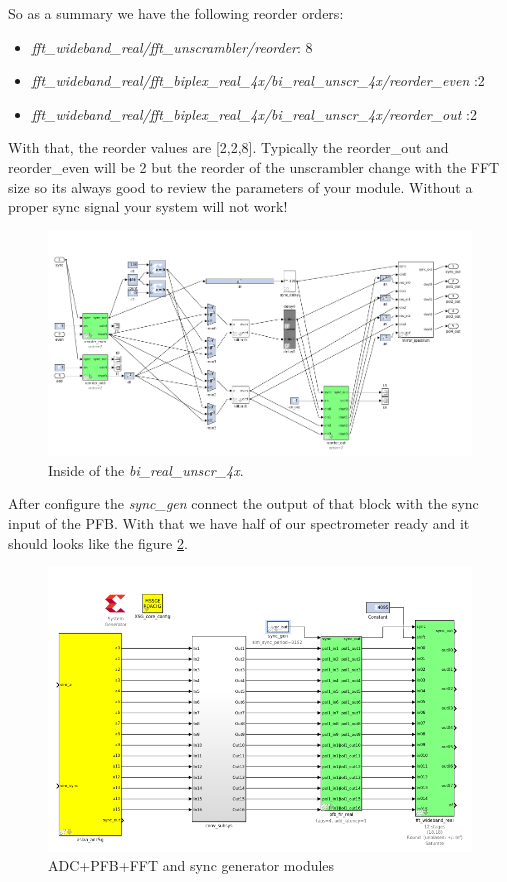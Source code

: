 So as a summary we have the following reorder orders:
\begin{itemize}
    \item \textit{fft\_wideband\_real/fft\_unscrambler/reorder}: 8
    \item \textit{fft\_wideband\_real/fft\_biplex\_real\_4x/bi\_real\_unscr\_4x/reorder\_even} :2 
    \item \textit{fft\_wideband\_real/fft\_biplex\_real\_4x/bi\_real\_unscr\_4x/reorder\_out} :2 
\end{itemize}

With that, the reorder values are [2,2,8]. Typically the reorder\_out and reorder\_even will be 2 but the reorder of the unscrambler change with the FFT size so its always good to review the parameters of your module.
Without a proper sync signal your system will not work!


\begin{figure}
    \centering
    \includegraphics[scale=0.4]{images/bi_unscr.png}
    \caption{Inside of the \textit{bi\_real\_unscr\_4x}.}
    \label{fig:bi_unscr}
\end{figure}

After configure the \textit{sync\_gen} connect the output of that block with the sync input of the PFB. With that we have half of our spectrometer ready and it should looks like the figure \ref{fig:first_half}.

\begin{figure}
    \centering
    \includegraphics[scale=0.4]{images/first_half.png}
    \caption{ADC+PFB+FFT and sync generator modules}
    \label{fig:first_half}
\end{figure}


